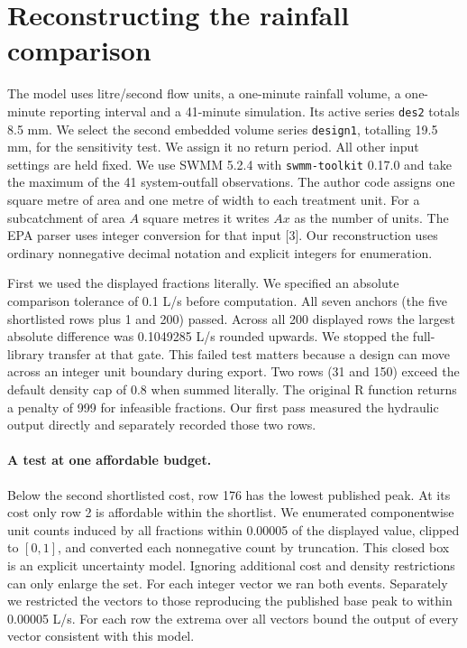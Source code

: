 \documentclass[11pt]{article}
\begin{document}
\newpage\section{Reconstructing the rainfall comparison}
The model uses litre/second flow units, a one-minute rainfall volume, a one-minute reporting interval and a 41-minute simulation. Its active series \texttt{des2} totals 8.5 mm. We select the second embedded volume series \texttt{design1}, totalling 19.5 mm, for the sensitivity test. We assign it no return period. All other input settings are held fixed. We use SWMM 5.2.4 with \texttt{swmm-toolkit} 0.17.0 and take the maximum of the 41 system-outfall observations. The author code assigns one square metre of area and one metre of width to each treatment unit. For a subcatchment of area \(A\) square metres it writes \(Ax\) as the number of units. The EPA parser uses integer conversion for that input [3]. Our reconstruction uses ordinary nonnegative decimal notation and explicit integers for enumeration.

First we used the displayed fractions literally. We specified an absolute comparison tolerance of 0.1 L/s before computation. All seven anchors (the five shortlisted rows plus 1 and 200) passed. Across all 200 displayed rows the largest absolute difference was 0.1049285 L/s rounded upwards. We stopped the full-library transfer at that gate. This failed test matters because a design can move across an integer unit boundary during export. Two rows (31 and 150) exceed the default density cap of 0.8 when summed literally. The original R function returns a penalty of 999 for infeasible fractions. Our first pass measured the hydraulic output directly and separately recorded those two rows.

\paragraph{A test at one affordable budget.} Below the second shortlisted cost, row 176 has the lowest published peak. At its cost only row 2 is affordable within the shortlist. We enumerated componentwise unit counts induced by all fractions within 0.00005 of the displayed value, clipped to \([0,1]\), and converted each nonnegative count by truncation. This closed box is an explicit uncertainty model. Ignoring additional cost and density restrictions can only enlarge the set. For each integer vector we ran both events. Separately we restricted the vectors to those reproducing the published base peak to within 0.00005 L/s. For each row the extrema over all vectors bound the output of every vector consistent with this model.
\end{document}
